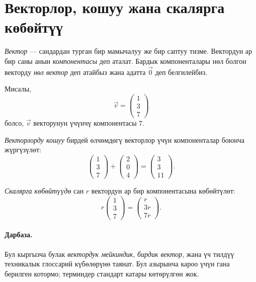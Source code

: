 \documentclass[12pt]{article}
\begin{document}
\section*{Векторлор, кошуу жана скалярга көбөйтүү}

\emph{Вектор} — сандардан турган бир мамычалуу же бир саптуу тизме. Вектордун ар бир саны анын \emph{компонентасы} деп аталат. Бардык компоненталары нөл болгон векторду \emph{нөл вектор} деп атайбыз жана адатта \(\vec{0}\) деп белгилейбиз.

Мисалы,
\[
  \vec{v}=\begin{pmatrix}1\\3\\7\end{pmatrix}
\]
болсо, \(\vec{v}\) векторунун үчүнчү компонентасы \(7\).

\emph{Векторлорду кошуу} бирдей өлчөмдөгү векторлор үчүн компоненталар боюнча жүргүзүлөт:
\[
  \begin{pmatrix}1\\3\\7\end{pmatrix}+
  \begin{pmatrix}2\\0\\4\end{pmatrix}
  =
  \begin{pmatrix}3\\3\\11\end{pmatrix}.
\]

\emph{Скалярга көбөйтүүдө} сан \(r\) вектордун ар бир компонентасына көбөйтүлөт:
\[
  r\begin{pmatrix}1\\3\\7\end{pmatrix}
  =
  \begin{pmatrix}r\\3r\\7r\end{pmatrix}.
\]

\paragraph{Дарбаза.} Бул кыргызча булак \emph{вектордук мейкиндик}, \emph{бирдик вектор}, жана үч тилдүү техникалык глоссарий күбөлөрүнө таянат. Бул азырынча кароо үчүн гана берилген котормо; терминдер стандарт катары көтөрүлгөн жок.
\end{document}
